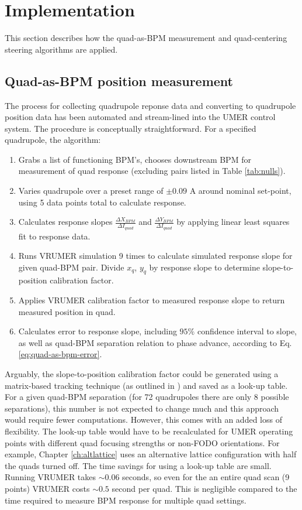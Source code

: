 \section{Implementation} \label{sec:steering:implementation}

This section describes how the quad-as-BPM measurement and quad-centering steering algorithms are applied.

\subsection{Quad-as-BPM position measurement}


The process for collecting quadrupole reponse data and converting to quadrupole position data has been automated and stream-lined into the UMER control system. The procedure is conceptually straightforward. For a specified quadrupole, the algorithm:

\begin{enumerate}
\item Grabs a list of functioning BPM's, chooses downstream BPM for measurement of quad response (excluding pairs listed in Table \ref{tab:nulls}).
\item Varies quadrupole over a preset range of $\pm 0.09$ A around nominal set-point, using 5 data points total to calculate response.
\item Calculates response slopes $\frac{\Delta X_{BPM}}{\Delta I_{quad}}$ and $\frac{\Delta Y_{BPM}}{\Delta I_{quad}}$ by applying linear least squares fit to response data.
\item Runs VRUMER simulation 9 times to calculate simulated response slope for given quad-BPM pair. Divide $x_q$, $y_q$ by response slope to determine slope-to-position calibration factor. 
\item Applies VRUMER calibration factor to measured response slope to return measured position in quad. 
\item Calculates error to response slope, including $95\%$ confidence interval to slope, as well as quad-BPM separation relation to phase advance, according to Eq. \ref{eq:quad-as-bpm-error}. 
\end{enumerate}

Arguably, the slope-to-position calibration factor could be generated using a matrix-based tracking technique (as outlined in \cite{KPRnote}) and saved as a look-up table. For a given quad-BPM separation (for 72 quadrupoles there are only 8 possible separations), this number is not expected to change much and this approach would require fewer computations. However, this comes with an added loss of flexibility. The look-up table would have to be recalculated for UMER operating points with different quad focusing strengths or non-FODO orientations. For example, Chapter \ref{ch:altlattice} uses an alternative lattice configuration with half the quads turned off. 
The time savings for using a look-up table are small. Running VRUMER takes $\sim 0.06$ 
seconds, so even for the an entire quad scan (9 points) VRUMER costs $\sim 0.5$ second per quad. This is negligible compared to the time required to measure BPM response for multiple quad settings.

